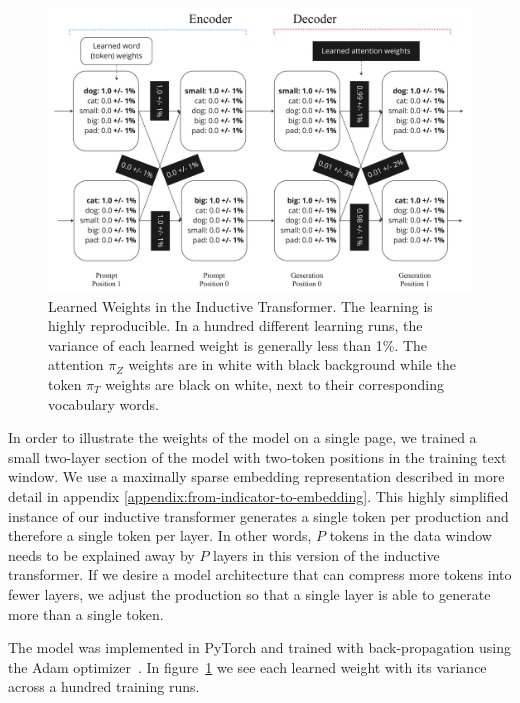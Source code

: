 \documentclass{article}
\begin{document}
\begin{figure}[H]
    \begin{center}
    \includegraphics[width=\textwidth]{figures/results_factor_graph_with_weights.pdf}
    \caption{Learned Weights in the Inductive Transformer. The learning is highly reproducible. In a hundred different learning runs, the variance of each learned weight is generally less than 1\%. The attention $\pi_Z$ weights are in white with black background while the token $\pi_T$ weights are black on white, next to their corresponding vocabulary words.}
    \label{fig:result-weights}
    \end{center}
\end{figure}

In order to illustrate the weights of the model on a single page, we trained a small two-layer section of the model with two-token positions in the training text window.  We use a maximally sparse embedding representation described in more detail in appendix \ref{appendix:from-indicator-to-embedding}.  This highly simplified instance of our inductive transformer generates a single token per production and therefore a single token per layer. In other words, $P$ tokens in the data window needs to be explained away by $P$ layers in this version of the inductive transformer.  If we desire a model architecture that can compress more tokens into fewer layers, we adjust the production so that a single layer is able to generate more than a single token.

The model was implemented in PyTorch and trained with back-propagation using the Adam optimizer~\citep{NEURIPS2019_9015, kingma2017adam}.  In figure~\ref{fig:result-weights} we see each learned weight with its variance across a hundred training runs.
\end{document}
